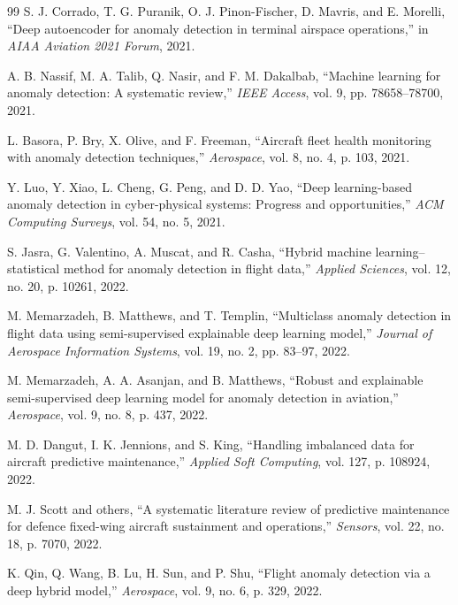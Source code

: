 \documentclass[12pt,a4paper]{report}
\begin{document}
\begin{thebibliography}{99}
		S. J. Corrado, T. G. Puranik, O. J. Pinon-Fischer, D. Mavris, and E. Morelli,
		``Deep autoencoder for anomaly detection in terminal airspace operations,''
		in \emph{AIAA Aviation 2021 Forum}, 2021.
		
		A. B. Nassif, M. A. Talib, Q. Nasir, and F. M. Dakalbab,
		``Machine learning for anomaly detection: A systematic review,''
		\emph{IEEE Access}, vol. 9, pp. 78658--78700, 2021.
		
		L. Basora, P. Bry, X. Olive, and F. Freeman,
		``Aircraft fleet health monitoring with anomaly detection techniques,''
		\emph{Aerospace}, vol. 8, no. 4, p. 103, 2021.
		
		Y. Luo, Y. Xiao, L. Cheng, G. Peng, and D. D. Yao,
		``Deep learning-based anomaly detection in cyber-physical systems: Progress and opportunities,''
		\emph{ACM Computing Surveys}, vol. 54, no. 5, 2021.
		
		S. Jasra, G. Valentino, A. Muscat, and R. Casha,
		``Hybrid machine learning--statistical method for anomaly detection in flight data,''
		\emph{Applied Sciences}, vol. 12, no. 20, p. 10261, 2022.
		
		M. Memarzadeh, B. Matthews, and T. Templin,
		``Multiclass anomaly detection in flight data using semi-supervised explainable deep learning model,''
		\emph{Journal of Aerospace Information Systems}, vol. 19, no. 2, pp. 83--97, 2022.
		
		M. Memarzadeh, A. A. Asanjan, and B. Matthews,
		``Robust and explainable semi-supervised deep learning model for anomaly detection in aviation,''
		\emph{Aerospace}, vol. 9, no. 8, p. 437, 2022.
		
		M. D. Dangut, I. K. Jennions, and S. King,
		``Handling imbalanced data for aircraft predictive maintenance,''
		\emph{Applied Soft Computing}, vol. 127, p. 108924, 2022.
		
		M. J. Scott and others,
		``A systematic literature review of predictive maintenance for defence fixed-wing aircraft sustainment and operations,''
		\emph{Sensors}, vol. 22, no. 18, p. 7070, 2022.
		
		K. Qin, Q. Wang, B. Lu, H. Sun, and P. Shu,
		``Flight anomaly detection via a deep hybrid model,''
		\emph{Aerospace}, vol. 9, no. 6, p. 329, 2022.
		

\end{thebibliography}
\end{document}

